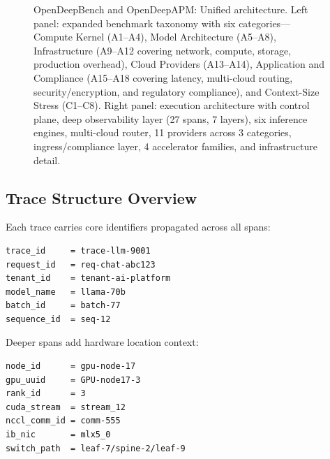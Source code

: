\documentclass[conference,10pt]{IEEEtran}
\begin{document}
\begin{figure}[!htbp]
\caption{OpenDeepBench and OpenDeepAPM: Unified architecture. Left panel: expanded benchmark taxonomy with six categories---Compute Kernel (A1--A4), Model Architecture (A5--A8), Infrastructure (A9--A12 covering network, compute, storage, production overhead), Cloud Providers (A13--A14), Application and Compliance (A15--A18 covering latency, multi-cloud routing, security/encryption, and regulatory compliance), and Context-Size Stress (C1--C8). Right panel: execution architecture with control plane, deep observability layer (27 spans, 7 layers), six inference engines, multi-cloud router, 11 providers across 3 categories, ingress/compliance layer, 4 accelerator families, and infrastructure detail.}
\label{fig:arch}
\end{figure}

\subsection{Trace Structure Overview}

Each trace carries core identifiers propagated across all spans:

\begin{lstlisting}
trace_id     = trace-llm-9001
request_id   = req-chat-abc123
tenant_id    = tenant-ai-platform
model_name   = llama-70b
batch_id     = batch-77
sequence_id  = seq-12
\end{lstlisting}

Deeper spans add hardware location context:

\begin{lstlisting}
node_id      = gpu-node-17
gpu_uuid     = GPU-node17-3
rank_id      = 3
cuda_stream  = stream_12
nccl_comm_id = comm-555
ib_nic       = mlx5_0
switch_path  = leaf-7/spine-2/leaf-9
\end{lstlisting}
\end{document}

